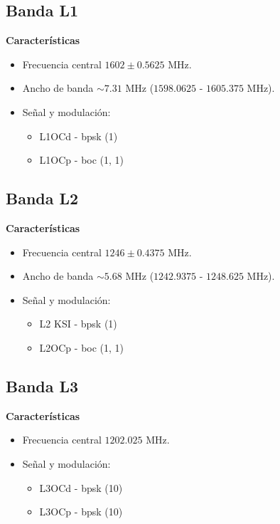 
\subsection{Banda L1}

\begin{justify}
    \textbf{Características}
    \begin{itemize}
        \item Frecuencia central $1602 \pm 0.5625$ MHz.
        \item Ancho de banda $\sim 7.31$ MHz ($1598.0625$ - $1605.375$ MHz).
        \item Señal y modulación:
        \begin{itemize}
            \item L1OCd - \gls{bpsk} (1)
            \item L1OCp - \gls{boc} (1, 1)
        \end{itemize}
    \end{itemize}
\end{justify}

\subsection{Banda L2}

\begin{justify}
    \textbf{Características}
    \begin{itemize}
        \item Frecuencia central $1246 \pm 0.4375$ MHz.
        \item Ancho de banda $\sim 5.68$ MHz ($1242.9375$ - $1248.625$ MHz).
        \item Señal y modulación:
        \begin{itemize}
            \item L2 KSI - \gls{bpsk} (1)
            \item L2OCp - \gls{boc} (1, 1)
        \end{itemize}
    \end{itemize}
\end{justify}

\subsection{Banda L3}

\begin{justify}
    \textbf{Características}
    \begin{itemize}
        \item Frecuencia central $1202.025$ MHz.
        \item Señal y modulación:
        \begin{itemize}
            \item L3OCd - \gls{bpsk} (10)
            \item L3OCp - \gls{bpsk} (10)
        \end{itemize}
    \end{itemize}
\end{justify}
